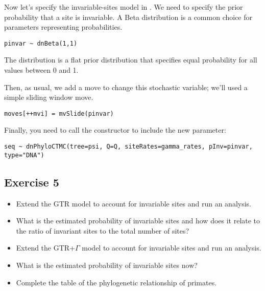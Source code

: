 Now let's specify the invariable-sites model in \RevBayes.
We need to specify the prior probability that a site is invariable.
A Beta distribution is a common choice for parameters representing probabilities.
{\tt \begin{snugshade*}
\begin{lstlisting}
pinvar ~ dnBeta(1,1)
\end{lstlisting}
\end{snugshade*}}
The  distribution is a flat prior distribution that specifies equal probability for all values between 0 and 1.

Then, as usual, we add a move to change this stochastic variable; we'll used a simple sliding window move.
{\tt \begin{snugshade*}
\begin{lstlisting}
moves[++mvi] = mvSlide(pinvar)
\end{lstlisting}
\end{snugshade*}}

Finally, you need to call the  constructor to include the new parameter:
{\tt \begin{snugshade*}
\begin{lstlisting}
seq ~ dnPhyloCTMC(tree=psi, Q=Q, siteRates=gamma_rates, pInv=pinvar, type="DNA")
\end{lstlisting}
\end{snugshade*}}

\subsection{Exercise 5}

\begin{itemize}
\item Extend the GTR model to account for invariable sites and run an analysis.
\item What is the estimated probability of invariable sites and how does it relate to the ratio of invariant sites to the total number of sites?
\item Extend the GTR+$\Gamma$ model to account for invariable sites and run an analysis.
\item What is the estimated probability of invariable sites now?
\item Complete the table of the phylogenetic relationship of primates.
\end{itemize} 




